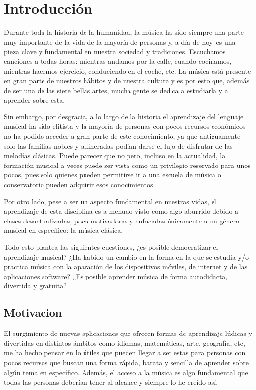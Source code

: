 \chapter{Introducción}


Durante toda la historia de la humanidad, la música ha sido siempre una parte muy importante de la vida de la mayoría de personas y, a día de hoy, es una pieza clave
 y fundamental en nuestra sociedad y tradiciones. Escuchamos canciones a todas horas: mientras andamos por la calle, 
 cuando cocinamos, mientras hacemos ejercicio, conduciendo en el coche, etc. La música está presente en gran
parte de nuestros hábitos y de nuestra cultura y es por esto que, además de ser una de las siete
 bellas artes, mucha gente se dedica a estudiarla y a aprender sobre esta.

Sin embargo, por desgracia, a lo largo de la historia el aprendizaje del lenguaje musical ha sido elitista y la mayoría
de personas con pocos recursos económicos no ha podido acceder a gran parte de este conocimiento, ya que antiguamente solo
las familias nobles y adineradas podían darse el lujo de disfrutar de las melodías clásicas. Puede parecer que no pero, incluso en la actualidad,
 la formación musical a veces puede ser vista como un privilegio reservado para unos pocos, pues solo
quienes pueden permitirse ir a una escuela de música o conservatorio pueden adquirir esos conocimientos.

Por otro lado, pese a ser un aspecto fundamental en nuestras vidas, el aprendizaje de esta disciplina es a menudo visto como algo aburrido debido a
clases desactualizadas, poco motivadoras y enfocadas únicamente a un género musical en específico: la música clásica.

\newpage
Todo esto plantea las siguientes cuestiones, ¿es posible democratizar el aprendizaje musical? ¿Ha habido un cambio en la forma en la que se estudia y/o practica música
con la aparación de los dispositivos móviles, de internet y de las aplicaciones software? ¿Es posible aprender música de forma autodidacta, divertida y
gratuita?


\section{Motivacion}
El surgimiento de nuevas aplicaciones que ofrecen formas de aprendizaje lúdicas y divertidas en distintos ámbitos como idiomas, matemáticas, arte, geografía, etc, 
me ha hecho pensar en lo útiles que pueden llegar a ser estas para personas con pocos recursos que buscan una forma rápida, barata y sencilla de aprender sobre
algún tema en específico. Además, el acceso a la música es algo fundamental que todas las personas deberían tener al alcance y siempre lo he creído así. 

